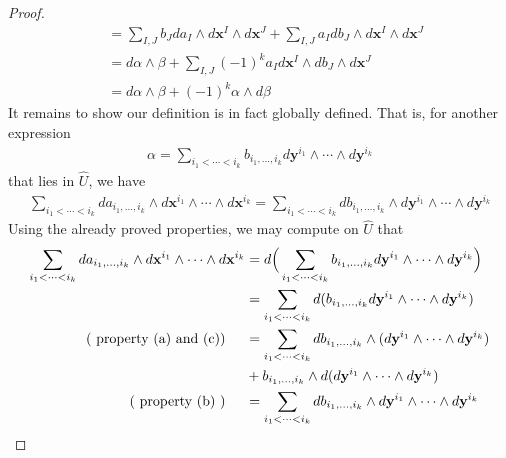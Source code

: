 \documentclass{report}
\begin{document}
\begin{proof}
\begin{align*}
&=\sum_{I,J} b_J d a_I \wedge   d\textbf{x}^I \wedge  d\textbf{x}^J + \sum_{I,J} a_I db_J \wedge  d\textbf{x}^I \wedge  d\textbf{x}^J   \\
&= d\alpha \wedge  \beta  + \sum_{I,J}(-1)^ka_I   d\textbf{x}^I \wedge db_J \wedge  d\textbf{x}^J       \\
&= d\alpha \wedge  \beta + (-1)^k \alpha \wedge  d \beta   
\end{align*}
It remains to show our definition is in fact globally defined. That is, for another expression 
\begin{align*}
\alpha = \sum_{i_1< \cdots <i_k}b_{i_1,\dots ,i_k}d\textbf{y}^{i_1}\wedge  \cdots \wedge d\textbf{y}^{i_k}  
\end{align*}
that lies in $\widehat{U}$, we have 
\begin{align*}
\sum_{i_1< \cdots < i_k}da_{i_1,\dots ,i_k} \wedge   d\textbf{x}^{i_1}\wedge  \cdots \wedge  d\textbf{x}^{i_k} = \sum_{i_1 <\cdots <i_k}db_{i_1,\dots ,i_k} \wedge  d\textbf{y}^{i_1}\wedge  \cdots \wedge  d\textbf{y}^{i_k}   
\end{align*}
Using the already proved properties, we may compute on $\widehat{U}$ that 
\begin{align*}
\sum_{i_1< \cdots < i_k}da_{i_1,\dots ,i_k} \wedge   d\textbf{x}^{i_1}\wedge  \cdots \wedge  d\textbf{x}^{i_k}&=d\Big(\sum_{i_1 <\cdots <i_k}b_{i_1,\dots ,i_k}  d\textbf{y}^{i_1}\wedge  \cdots \wedge  d\textbf{y}^{i_k}   \Big)\\
&= \sum_{i_1 <\cdots <i_k} d (b_{i_1,\dots ,i_k}  d\textbf{y}^{i_1}\wedge  \cdots \wedge  d\textbf{y}^{i_k}) \\
(\text{ property (a) and (c)})\hspace{0.5cm}&= \sum_{i_1 <\cdots <i_k} db_{i_1,\dots ,i_k} \wedge (d\textbf{y}^{i_1}\wedge  \cdots \wedge  d\textbf{y}^{i_k}  ) \\
&+ b_{i_1,\dots ,i_k} \wedge d(d\textbf{y}^{i_1}\wedge  \cdots \wedge  d\textbf{y}^{i_k}  ) \\
(\text{ property (b) })\hspace{0.5cm}&=  \sum_{i_1< \cdots <i_k} db_{i_1,\dots ,i_k}\wedge  d\textbf{y}^{i_1}\wedge  \cdots \wedge  d\textbf{y}^{i_k}   
\end{align*}
\end{proof} 
\end{document}
